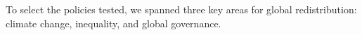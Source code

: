 To select the policies tested, we spanned three key areas for global redistribution: climate change, inequality, and global governance. 